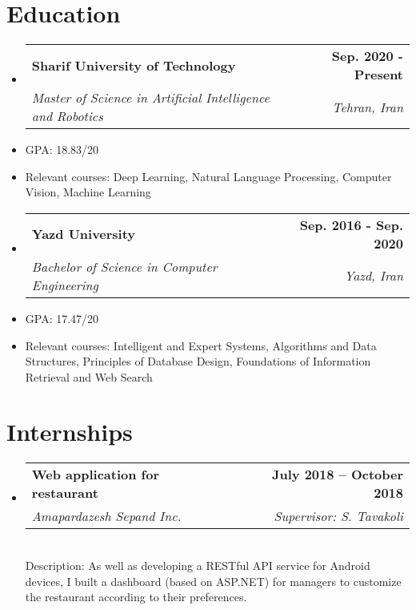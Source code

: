 \documentclass[letterpaper,11pt]{article}
\makeatletter
\newcommand{\resumeSubheading}[4]{
  \vspace{-2pt}\item
    \begin{tabular*}{1.0\textwidth}[t]{l@{\extracolsep{\fill}}r}
      \textbf{#1} & \textbf{\small #2} \\
    \textcolor{sgray} {\textit{\small#3}} & \textcolor{sgray}{ \textit{\small #4} }\\
    \end{tabular*}\vspace{-7pt}
}
\newcommand{\resumeSubheadingD}[5]{
  \vspace{-2pt}\item
    \begin{tabular*}{1.0\textwidth}[t]{l@{\extracolsep{\fill}}r}
      \textbf{#1} & \textbf{\small #2} \\
    \textcolor{sgray} {\textit{\small#3}} & \textcolor{sgray}{ \textit{\small #4} }\\
    \end{tabular*} %
    \\ \vspace{3pt}
    Description:{#5}
}
\newcommand{\resumeSubHeadingListStart}{\begin{itemize}[leftmargin=0.0in, label={}]}
\newcommand{\resumeSubHeadingListEnd}{\end{itemize}}
\makeatother
\begin{document}
\section{Education}
  \resumeSubHeadingListStart
    \resumeSubheading
      {Sharif University of Technology}{Sep. 2020 - Present}
      {Master of Science in Artificial Intelligence and Robotics}{Tehran, Iran}
  \resumeSubHeadingListEnd
    

\begin{itemize}[itemsep=-3pt, parsep=5pt]
\item  GPA: 18.83/20

\item Relevant courses:
Deep Learning,
Natural Language Processing, Computer Vision,
Machine Learning 
\end{itemize}  


  \resumeSubHeadingListStart
    \resumeSubheading
      {Yazd University}{Sep. 2016 - Sep. 2020}
      {Bachelor of Science in Computer Engineering}{Yazd, Iran}
  \resumeSubHeadingListEnd
  
\begin{itemize}[itemsep=-3pt, parsep=5pt]
	\item  GPA: 17.47/20
	
	\item Relevant courses:
	Intelligent and Expert Systems, Algorithms and Data Structures, Principles of Database Design, Foundations of Information Retrieval and Web Search
\end{itemize}  

  
\begin{comment}
\resumeSubHeadingListStart
    \resumeSubheading
      {Malek Sabet High School}{Sep 2012 - June. 2016}
      {Diploma in Physics and Mathematics Discipline}{Yazd, Iran}
  \resumeSubHeadingListEnd
 \small{ GPA: \textbf{19.49}/20, Units: 102, {\href{https://en.wikipedia.org/wiki/Governmental_leading_high_school}{ Affiliation: Governmental leading high school}}
\end{comment}  


\section{Internships}

\resumeSubHeadingListStart
\resumeSubheadingD
{Web application for restaurant }{July 2018 – October 2018}
{Amapardazesh Sepand Inc. }{Supervisor: S. Tavakoli}
{
	As well as developing a RESTful API service for Android devices, I built a dashboard  (based on ASP.NET) for managers to customize the restaurant according to their preferences.
}
\resumeSubHeadingListEnd
\end{document}
